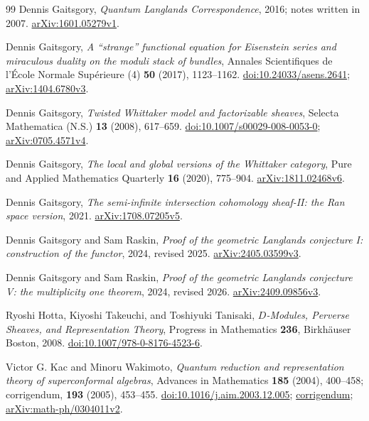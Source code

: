 \begin{thebibliography}{99}
Dennis Gaitsgory,
\emph{Quantum Langlands Correspondence}, 2016; notes written in 2007.
\href{https://arxiv.org/abs/1601.05279v1}{arXiv:1601.05279v1}.

Dennis Gaitsgory,
\emph{A ``strange'' functional equation for Eisenstein series and miraculous
duality on the moduli stack of bundles},
Annales Scientifiques de l'\'Ecole Normale Sup\'erieure (4)
\textbf{50} (2017), 1123--1162.
\href{https://doi.org/10.24033/asens.2641}{doi:10.24033/asens.2641};
\href{https://arxiv.org/abs/1404.6780v3}{arXiv:1404.6780v3}.

Dennis Gaitsgory,
\emph{Twisted Whittaker model and factorizable sheaves},
Selecta Mathematica (N.S.) \textbf{13} (2008), 617--659.
\href{https://doi.org/10.1007/s00029-008-0053-0}{doi:10.1007/s00029-008-0053-0};
\href{https://arxiv.org/abs/0705.4571v4}{arXiv:0705.4571v4}.

Dennis Gaitsgory,
\emph{The local and global versions of the Whittaker category},
Pure and Applied Mathematics Quarterly \textbf{16} (2020), 775--904.
\href{https://arxiv.org/abs/1811.02468v6}{arXiv:1811.02468v6}.

Dennis Gaitsgory,
\emph{The semi-infinite intersection cohomology sheaf-II: the Ran space version},
2021.
\href{https://arxiv.org/abs/1708.07205v5}{arXiv:1708.07205v5}.

Dennis Gaitsgory and Sam Raskin,
\emph{Proof of the geometric Langlands conjecture I: construction of the functor},
2024, revised 2025.
\href{https://arxiv.org/abs/2405.03599v3}{arXiv:2405.03599v3}.

Dennis Gaitsgory and Sam Raskin,
\emph{Proof of the geometric Langlands conjecture V: the multiplicity one theorem},
2024, revised 2026.
\href{https://arxiv.org/abs/2409.09856v3}{arXiv:2409.09856v3}.

Ryoshi Hotta, Kiyoshi Takeuchi, and Toshiyuki Tanisaki,
\emph{$D$-Modules, Perverse Sheaves, and Representation Theory},
Progress in Mathematics \textbf{236}, Birkh\"auser Boston, 2008.
\href{https://doi.org/10.1007/978-0-8176-4523-6}{doi:10.1007/978-0-8176-4523-6}.

Victor G. Kac and Minoru Wakimoto,
\emph{Quantum reduction and representation theory of superconformal algebras},
Advances in Mathematics \textbf{185} (2004), 400--458;
corrigendum, \textbf{193} (2005), 453--455.
\href{https://doi.org/10.1016/j.aim.2003.12.005}{doi:10.1016/j.aim.2003.12.005};
\href{https://doi.org/10.1016/j.aim.2005.01.001}{corrigendum};
\href{https://arxiv.org/abs/math-ph/0304011v2}{arXiv:math-ph/0304011v2}.


\end{thebibliography}
